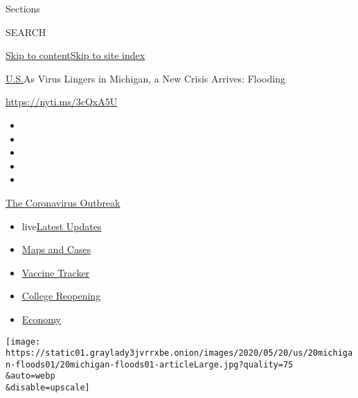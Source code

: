 Sections

SEARCH

\protect\hyperlink{site-content}{Skip to
content}\protect\hyperlink{site-index}{Skip to site index}

\href{/section/us}{U.S.}\textbar{}As Virus Lingers in Michigan, a New
Crisis Arrives: Flooding

\url{https://nyti.ms/3cQxA5U}

\begin{itemize}
\item
\item
\item
\item
\item
\end{itemize}

\href{https://www.nytimes3xbfgragh.onion/news-event/coronavirus?action=click\&pgtype=Article\&state=default\&region=TOP_BANNER\&context=storylines_menu}{The
Coronavirus Outbreak}

\begin{itemize}
\tightlist
\item
  live\href{https://www.nytimes3xbfgragh.onion/2020/08/04/world/coronavirus-cases.html?action=click\&pgtype=Article\&state=default\&region=TOP_BANNER\&context=storylines_menu}{Latest
  Updates}
\item
  \href{https://www.nytimes3xbfgragh.onion/interactive/2020/us/coronavirus-us-cases.html?action=click\&pgtype=Article\&state=default\&region=TOP_BANNER\&context=storylines_menu}{Maps
  and Cases}
\item
  \href{https://www.nytimes3xbfgragh.onion/interactive/2020/science/coronavirus-vaccine-tracker.html?action=click\&pgtype=Article\&state=default\&region=TOP_BANNER\&context=storylines_menu}{Vaccine
  Tracker}
\item
  \href{https://www.nytimes3xbfgragh.onion/2020/08/02/us/covid-college-reopening.html?action=click\&pgtype=Article\&state=default\&region=TOP_BANNER\&context=storylines_menu}{College
  Reopening}
\item
  \href{https://www.nytimes3xbfgragh.onion/live/2020/08/04/business/stock-market-today-coronavirus?action=click\&pgtype=Article\&state=default\&region=TOP_BANNER\&context=storylines_menu}{Economy}
\end{itemize}

\texttt{[image: https://static01.graylady3jvrrxbe.onion/images/2020/05/20/us/20michigan-floods01/20michigan-floods01-articleLarge.jpg?quality=75\\\&auto=webp\\\&disable=upscale]}

